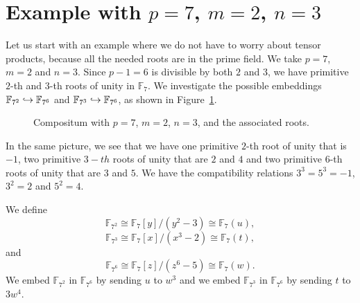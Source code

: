 \documentclass[a4paper,11pt]{article}
\begin{document}
\section{Example with $p=7$, $m=2$, $n=3$}
Let us start with an example where we do not have to worry about tensor
products, because all the needed roots are in the prime field. We take $p=7$,
$m=2$ and $n=3$. Since $p-1=6$ is divisible by both $2$ and $3$, we have
primitive $2$-th and $3$-th roots of unity in $\mathbb{F}_7$. We investigate the
possible embeddings $\mathbb{F}_{7^2}\hookrightarrow\mathbb{F}_{7^6}$ and
$\mathbb{F}_{7^3}\hookrightarrow\mathbb{F}_{7^6}$, as shown in Figure~\ref{fig:p7}.
\begin{figure}
  \centering
{}
\phantom{and}
  \caption{Compositum with $p=7$, $m=2$, $n=3$, and the associated roots.}
  \label{fig:p7}
\end{figure}
In the same picture, we see that we have one primitive $2$-th root of unity that
is $-1$, two primitive $3-th$ roots of unity that are $2$ and $4$ and two
primitive $6$-th roots of unity that are $3$ and $5$. We have the compatibility
relations $3^3=5^3=-1$, $3^2=2$ and $5^2=4$.

We define 
\[
  \mathbb{F}_{7^2}\cong \mathbb{F}_7[y]/(y^2-3)\cong \mathbb{F}_7(u),
\]
\[
  \mathbb{F}_{7^3}\cong \mathbb{F}_7[x]/(x^3-2)\cong \mathbb{F}_7(t),
\]
and
\[
  \mathbb{F}_{7^6}\cong \mathbb{F}_7[z]/(z^6-5)\cong \mathbb{F}_7(w).
\]
We embed $\mathbb{F}_{7^2}$ in $\mathbb{F}_{7^6}$ by sending $u$ to $w^3$ and we
embed $\mathbb{F}_{7^3}$ in $\mathbb{F}_{7^6}$ by sending $t$ to $3w^4$.
\end{document}
